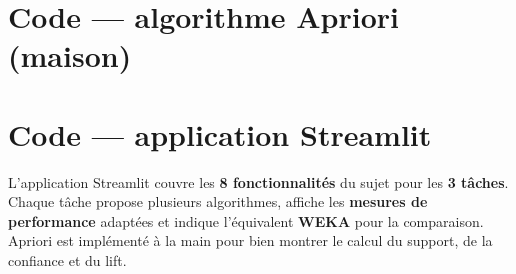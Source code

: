 \section{Code — algorithme Apriori (maison)}


\section{Code — application Streamlit}


\begin{Resume}
L'application Streamlit couvre les \textbf{8 fonctionnalités} du sujet pour les
\textbf{3 tâches}. Chaque tâche propose plusieurs algorithmes, affiche les
\textbf{mesures de performance} adaptées et indique l'équivalent \textbf{WEKA} pour la
comparaison. Apriori est implémenté \og à la main \fg{} pour bien montrer le calcul du
support, de la confiance et du lift.
\end{Resume}
